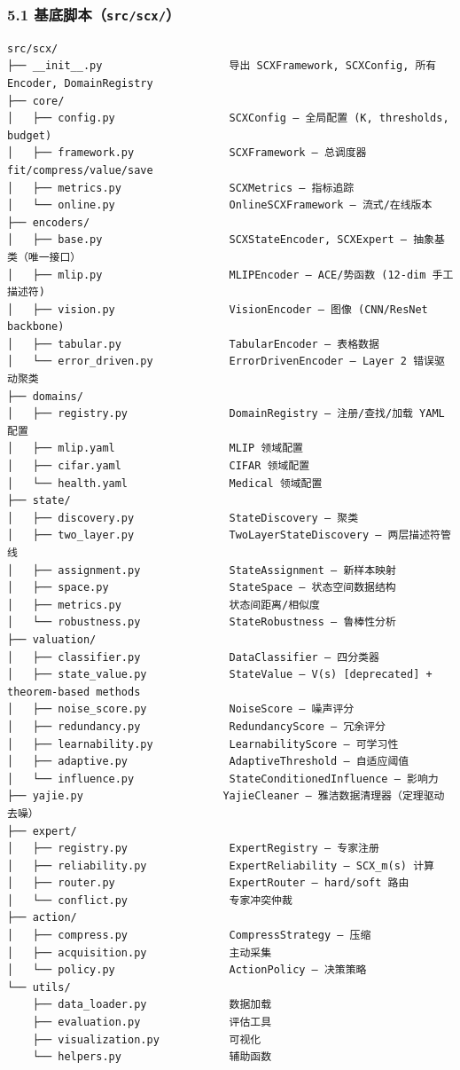 \documentclass[
  12pt,
]{ctexart}
\begin{document}
\subsubsection{\texorpdfstring{5.1
基底脚本（\texttt{src/scx/}）}{5.1 基底脚本（src/scx/）}}\label{ux57faux5e95ux811aux672csrcscx}

\begin{verbatim}
src/scx/
├── __init__.py                    导出 SCXFramework, SCXConfig, 所有 Encoder, DomainRegistry
├── core/
│   ├── config.py                  SCXConfig — 全局配置 (K, thresholds, budget)
│   ├── framework.py               SCXFramework — 总调度器 fit/compress/value/save
│   ├── metrics.py                 SCXMetrics — 指标追踪
│   └── online.py                  OnlineSCXFramework — 流式/在线版本
├── encoders/
│   ├── base.py                    SCXStateEncoder, SCXExpert — 抽象基类（唯一接口）
│   ├── mlip.py                    MLIPEncoder — ACE/势函数 (12-dim 手工描述符)
│   ├── vision.py                  VisionEncoder — 图像 (CNN/ResNet backbone)
│   ├── tabular.py                 TabularEncoder — 表格数据
│   └── error_driven.py            ErrorDrivenEncoder — Layer 2 错误驱动聚类
├── domains/
│   ├── registry.py                DomainRegistry — 注册/查找/加载 YAML 配置
│   ├── mlip.yaml                  MLIP 领域配置
│   ├── cifar.yaml                 CIFAR 领域配置
│   └── health.yaml                Medical 领域配置
├── state/
│   ├── discovery.py               StateDiscovery — 聚类
│   ├── two_layer.py               TwoLayerStateDiscovery — 两层描述符管线
│   ├── assignment.py              StateAssignment — 新样本映射
│   ├── space.py                   StateSpace — 状态空间数据结构
│   ├── metrics.py                 状态间距离/相似度
│   └── robustness.py              StateRobustness — 鲁棒性分析
├── valuation/
│   ├── classifier.py              DataClassifier — 四分类器
│   ├── state_value.py             StateValue — V(s) [deprecated] + theorem-based methods
│   ├── noise_score.py             NoiseScore — 噪声评分
│   ├── redundancy.py              RedundancyScore — 冗余评分
│   ├── learnability.py            LearnabilityScore — 可学习性
│   ├── adaptive.py                AdaptiveThreshold — 自适应阈值
│   └── influence.py               StateConditionedInfluence — 影响力
├── yajie.py                      YajieCleaner — 雅洁数据清理器（定理驱动去噪）
├── expert/
│   ├── registry.py                ExpertRegistry — 专家注册
│   ├── reliability.py             ExpertReliability — SCX_m(s) 计算
│   ├── router.py                  ExpertRouter — hard/soft 路由
│   └── conflict.py                专家冲突仲裁
├── action/
│   ├── compress.py                CompressStrategy — 压缩
│   ├── acquisition.py             主动采集
│   └── policy.py                  ActionPolicy — 决策策略
└── utils/
    ├── data_loader.py             数据加载
    ├── evaluation.py              评估工具
    ├── visualization.py           可视化
    └── helpers.py                 辅助函数
\end{verbatim}
\end{document}
